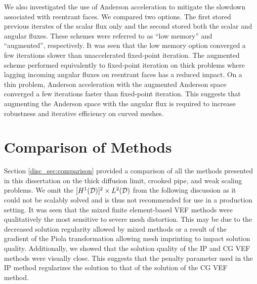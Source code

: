 \documentclass[../doc.tex]{subfiles}
\begin{document}
We also investigated the use of Anderson acceleration to mitigate the slowdown associated with reentrant faces. We compared two options. The first stored previous iterates of the scalar flux only and the second stored both the scalar and angular fluxes. These schemes were referred to as ``low memory'' and ``augmented'', respectively. It was seen that the low memory option converged a few iterations slower than unaccelerated fixed-point iteration. The augmented scheme performed equivalently to fixed-point iteration on thick problems where lagging incoming angular fluxes on reentrant faces has a reduced impact. On a thin problem, Anderson acceleration with the augmented Anderson space converged a few iterations faster than fixed-point iteration. This suggests that augmenting the Anderson space with the angular flux is required to increase robustness and iterative efficiency on curved meshes. 

\section{Comparison of Methods}
Section \ref{disc_sec:comparison} provided a comparison of all the methods presented in this dissertation on the thick diffusion limit, crooked pipe, and weak scaling problems. We omit the $[H^1(\mathcal{D})]^2\times L^2(\mathcal{D})$ from the following discussion as it could not be scalably solved and is thus not recommended for use in a production setting. 
It was seen that the mixed finite element-based VEF methods were qualitatively the most sensitive to severe mesh distortion. This may be due to the decreased solution regularity allowed by mixed methods or a result of the gradient of the Piola transformation allowing mesh imprinting to impact solution quality. Additionally, we showed that the solution quality of the IP and CG VEF methods were visually close. This suggests that the penalty parameter used in the IP method regularizes the solution to that of the solution of the CG VEF method. 
\end{document}
